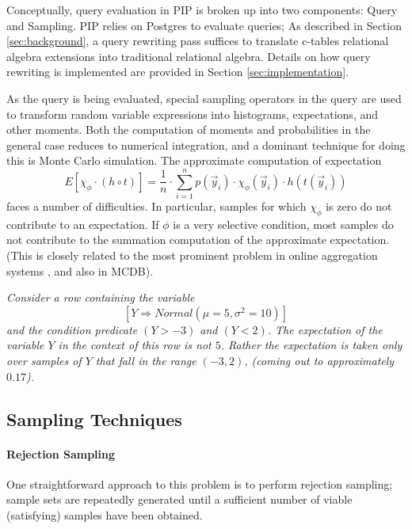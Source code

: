 Conceptually, query evaluation in PIP is broken up into two components: Query and Sampling.  PIP relies on Postgres to evaluate queries; As described in Section \ref{sec:background}, a query rewriting pass suffices to translate c-tables relational algebra extensions into traditional relational algebra.  Details on how query rewriting is implemented are provided in Section \ref{sec:implementation}.  

As the query is being evaluated, special sampling operators in the query are used to transform random variable expressions into histograms, expectations, and other moments.  Both the computation of moments and probabilities in the general case reduces to numerical integration, and a dominant technique for doing this is Monte Carlo simulation. The approximate computation of expectation
\begin{equation}
E[\chi_\phi \cdot (h \circ t)] =
\frac{1}{n} \cdot \sum_{i=1}^n p(\vec{y}_i) \cdot \chi_\phi(\vec{y}_i) \cdot
h(t(\vec{y}_i))
\end{equation}
faces a number of difficulties.  In particular, samples for which $\chi_{\phi}$ is zero do not contribute to an expectation.  If $\phi$ is a very selective condition, most samples do not contribute to the summation computation of the approximate expectation.  (This is closely related to the most prominent problem in online aggregation systems \cite{OnlineAggregation,DBO}, and also in MCDB).

\begin{example}\em 
Consider a row containing the variable 
$$[Y \Rightarrow Normal(\mu=5,\sigma^2=10)]$$
and the condition predicate $(Y > -3)$ and $(Y < 2)$.  The expectation of the variable $Y$ in the context of this row is not $5$.  Rather the expectation is taken only over samples of $Y$ that fall in the range $(-3,2)$, (coming out to approximately $0.17$).  
\end{example}

\subsection{Sampling Techniques}
\label{subsec:samplingTechs}

\paragraph{Rejection Sampling}
One straightforward approach to this problem is to perform rejection sampling; sample sets are repeatedly generated until a sufficient number of viable (satisfying) samples have been obtained.  %

